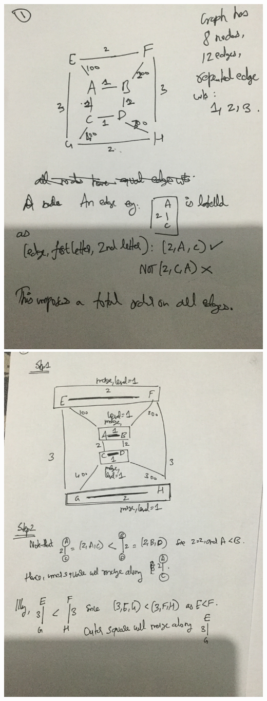 \documentclass{article}
\begin{document}
\includegraphics[width=1\textwidth, angle=270]{IMG_0626.JPG}
\includegraphics[width=1\textwidth, angle=270]{IMG_0627.JPG}
\end{document}
